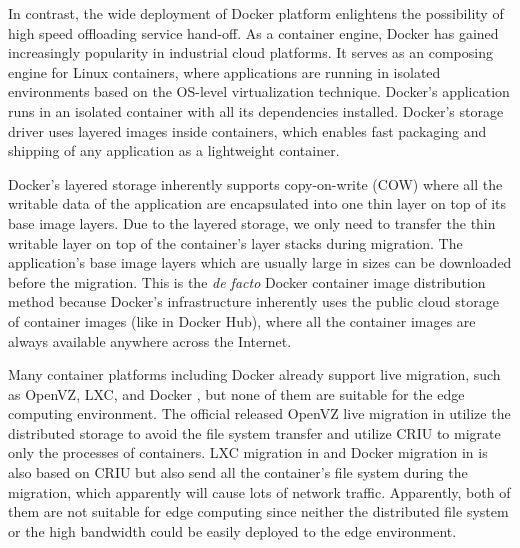 In contrast, the wide deployment of Docker platform enlightens the possibility of high speed offloading service hand-off. As a container engine, Docker has gained increasingly popularity in industrial cloud platforms. It serves as an composing engine for Linux containers, where applications are running in isolated environments based on the OS-level virtualization technique.
Docker's application runs in an isolated container with all its dependencies installed. Docker's storage driver uses layered images inside containers, which enables fast packaging and shipping of any application as a lightweight container. 

Docker's layered storage inherently supports copy-on-write (COW) where all the writable data of the application are encapsulated into one thin layer on top of its base image layers.
Due to the layered storage, we only need to transfer the thin writable layer on top of the container's layer stacks during migration. The application's base image layers which are usually large in sizes can be downloaded before the migration. 
This is the \textit{de facto} Docker container image distribution method because Docker's infrastructure inherently uses the public cloud storage of container images (like in Docker Hub\cite{dockerhub}), where all the container images are always available anywhere across the Internet. 

Many container platforms including Docker already support live migration, such as OpenVZ\cite{openvz}, LXC\cite{qiu2016evaluating}, and Docker \cite{phaul,boucherPhaul}, but none of them are suitable for the edge computing environment. The official released OpenVZ live migration in \cite{phaul} utilize the distributed storage to avoid the file system transfer and utilize CRIU \cite{criu} to migrate only the processes of containers.
LXC migration in \cite{qiu2016evaluating} and Docker migration in \cite{phaul, boucherPhaul} is also based on CRIU but also send all the container's file system during the migration, which apparently will cause lots of network traffic. Apparently, both of them are not suitable for edge computing since neither the distributed file system or the high bandwidth could be easily deployed to the edge environment.

